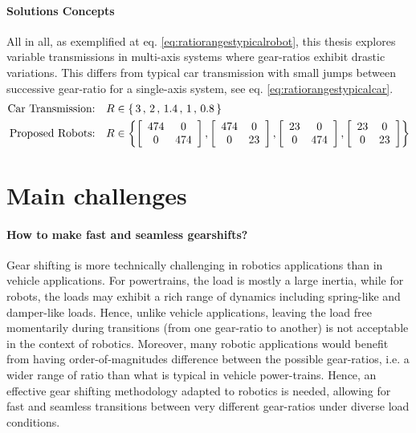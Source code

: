 \paragraph{Solutions Concepts}
%
All in all, as exemplified at eq. \eqref{eq:ratiorangestypicalrobot}, this thesis explores variable transmissions in multi-axis systems where gear-ratios exhibit drastic variations. This differs from typical car transmission with small jumps between successive gear-ratio for a single-axis system, see eq. \eqref{eq:ratiorangestypicalcar}.
%
\begin{align}
  \text{Car Transmission:}& \quad R \in \{ \, 3 \, , \,  2 \, , \, 1.4 \, , \, 1 \, , \, 0.8 \, \} 
	\label{eq:ratiorangestypicalcar}
	\\
	\text{Proposed Robots:}& \quad R \in 
	\left \{
	\left[
	\begin{array}{c c}
	474 & 0 \\ 0 & 474
	\end{array} 
	\right]
	,
	\left[
	\begin{array}{c c}
	474 & 0 \\ 0 & 23
	\end{array} 
	\right]
	,
	\left[
	\begin{array}{c c}
	23 & 0 \\ 0 & 474
	\end{array} 
	\right]
	,
	\left[
	\begin{array}{c c}
	23 & 0 \\ 0 & 23
	\end{array} 
	\right]
	\right \}
 \label{eq:ratiorangestypicalrobot}
\end{align}


\newpage

\section{Main challenges}
\label{sec:MainChallenges}

\paragraph{How to make fast and seamless gearshifts?}
Gear shifting is more technically challenging in robotics applications than in vehicle applications. For powertrains, the load is mostly a large inertia, while for robots, the loads may exhibit a rich range of dynamics including spring-like and damper-like loads. Hence, unlike vehicle applications, leaving the load free momentarily during transitions (from one gear-ratio to another) is not acceptable in the context of robotics. Moreover, many robotic applications would benefit from having order-of-magnitudes difference between the possible gear-ratios, i.e. a wider range of ratio than what is typical in vehicle power-trains. Hence, an effective gear shifting methodology adapted to robotics is needed, allowing for fast and seamless transitions between very different gear-ratios under diverse load conditions.

